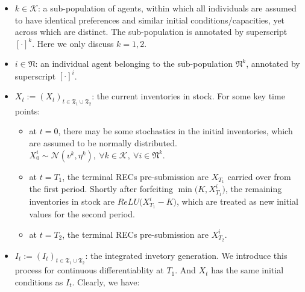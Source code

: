 \documentclass[a4paper,10pt]{article}
\newcommand{\1}{\mathbf{1}}
\begin{document}
\begin{itemize}
\item
  \(k \in \mathcal{K}\): a sub-population of agents, within which all
  individuals are assumed to have identical preferences and similar
  initial conditions/capacities, yet across which are distinct. The
  sub-population is annotated by superscript \([\cdot]^{k}\). Here we
  only discuss \(k=1,2\).
\item
  \(i \in \mathfrak{N}\): an individual agent belonging to the
  sub-population \(\mathfrak{N}^k\), annotated by superscript
  \([\cdot]^{i}\).
\item
  \(X_t := (X_t)_{t\in\mathfrak{T_1} \cup \mathfrak{T_2}}\): the current
  inventories in stock. For some key time points:

  \begin{itemize}
  \tightlist
  \item
    at \(t=0\), there may be some stochastics in the initial
    inventories, which are assumed to be normally distributed.
    \(X_0^{i} \sim \mathcal{N}(v^k, \eta^k) ,~ \forall k \in \mathcal{K},~\forall i \in \mathfrak{N}^k\).
  \item
    at \(t=T_1\), the terminal RECs pre-submission are \(X_{T_1}\)
    carried over from the first period. Shortly after forfeiting
    \(\min\Big(K,X^i_{T_1}\Big)\), the remaining inventories in stock
    are \(ReLU\Big(X^i_{T_1}-K\Big)\), which are treated as new initial
    values for the second period.
  \item
    at \(t=T_2\), the terminal RECs pre-submission are \(X^i_{T_2}\).
  \end{itemize}
\item
  \(I_t := (I_t)_{t\in\mathfrak{T_1} \cup \mathfrak{T_2}}\): the
  integrated invetory generation. We introduce this process for
  continuous differentiablity at \(T_1\). And \(X_t\) has the same
  initial conditions as \(I_t\). Clearly, we have:


\end{itemize}
\end{document}
